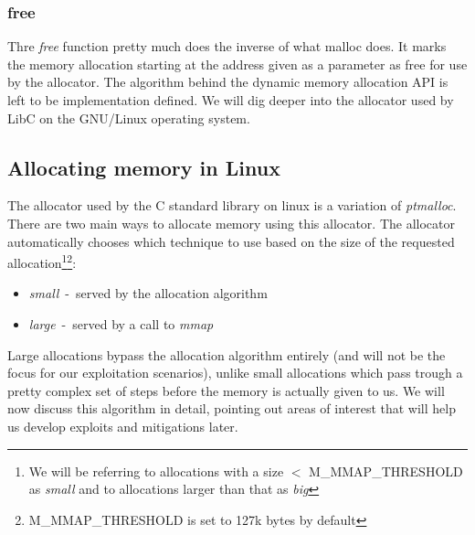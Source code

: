\documentclass{article}
\begin{document}
\subsubsection{free}
Thre \emph{free} function pretty much does the inverse of what malloc does. It
marks the memory allocation starting at the address given as a parameter as free
for use by the allocator. The algorithm behind the dynamic memory allocation API
is left to be implementation defined. We will dig deeper into the
allocator used by LibC on the GNU/Linux operating system.


\subsection{Allocating memory in Linux}
The allocator used by the C standard library on linux is a variation of
\emph{ptmalloc}. There are two main ways to allocate memory using this
allocator. The allocator automatically chooses which technique to use based on
the size of the requested allocation\footnote{We will be referring to
allocations with a size $<$ {M\_MMAP\_THRESHOLD} as \emph{small} and to
allocations larger than that as \emph{big}}\footnote{{M\_MMAP\_THRESHOLD} is set
to 127k bytes by default}:
\begin{itemize}
  \item \emph{small}~-~served by the allocation algorithm
  \item \emph{large}~-~served by a call to \emph{mmap}
\end{itemize}

Large allocations bypass the allocation algorithm entirely (and will not be the
focus for our exploitation scenarios), unlike small allocations which pass
trough a pretty complex set of steps before the memory is actually given to us.
We will now discuss this algorithm in detail, pointing out areas of interest
that will help us develop exploits and mitigations later.
\end{document}
